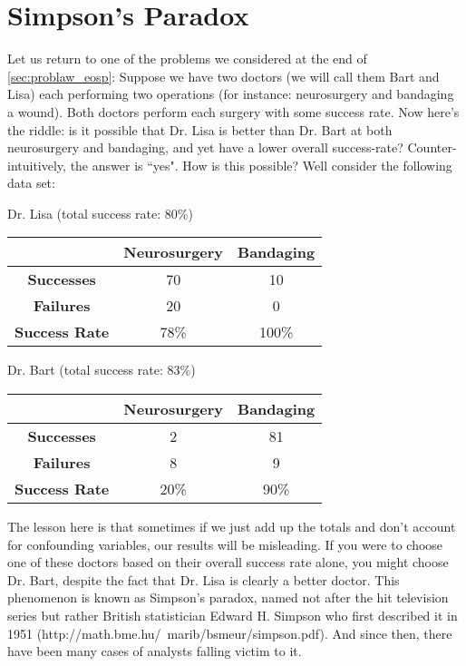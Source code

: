 \section{Simpson's Paradox}
Let us return to one of the problems we considered at the end of \ref{sec:problaw_eosp}: Suppose we have two doctors (we will call them Bart and Lisa) each performing two operations (for instance: neurosurgery and bandaging a wound). Both doctors perform each surgery with some success rate. Now here's the riddle: is it possible that Dr. Lisa is better than Dr. Bart at both neurosurgery and bandaging, and yet have a lower overall success-rate? Counter-intuitively, the answer is ``yes". How is this possible? Well consider the following data set:
\vspace{15px}
\begin{center}
Dr. Lisa (total success rate: 80\%)\\
\vspace{5px}
\begin{tabular}{c|cc }
& \textbf{Neurosurgery} & \textbf{Bandaging} \\ 
\hline
\textbf{Successes} & 70 & 10 \\  
\textbf{Failures} & 20 & 0 \\
\hline
\textbf{Success Rate} & 78\% & 100\% 
\end{tabular}
\end{center}

\vspace{15px}
\begin{center}
Dr. Bart (total success rate: 83\%)\\
\vspace{5px}
\begin{tabular}{c|cc}
&\textbf{Neurosurgery} & \textbf{Bandaging} \\ 
\hline
\textbf{Successes} & 2 & 81 \\  
\textbf{Failures} & 8 & 9 \\
\hline
\textbf{Success Rate} & 20\% & 90\% 
\end{tabular}
\vspace{15px}
\end{center}

The lesson here is that sometimes if we just add up the totals and don't account for confounding variables, our results will be misleading. If you were to choose one of these doctors based on their overall success rate alone, you might choose Dr. Bart, despite the fact that Dr. Lisa is clearly a better doctor. This phenomenon is known as Simpson's paradox, named not after the hit television series but rather British statistician Edward H. Simpson who first described it in 1951 (\todo http://math.bme.hu/~marib/bsmeur/simpson.pdf). And since then, there have been many cases of analysts falling victim to it.

